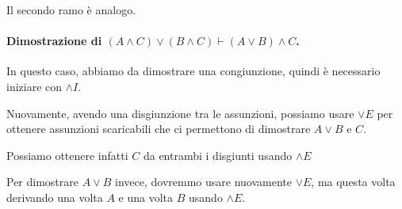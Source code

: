 Il secondo ramo è analogo.

\begin{prooftree}
\end{prooftree}

\paragraph{Dimostrazione di \((A \land C) \lor (B \land C) \vdash (A \lor B) \land C\).}

In questo caso, abbiamo da dimostrare una congiunzione, quindi è necessario iniziare con \(\land I\).

\begin{prooftree}
\end{prooftree}

Nuovamente, avendo una disgiunzione tra le assunzioni, possiamo usare \(\lor E\) per ottenere assunzioni scaricabili che ci permettono di dimostrare \(A \lor B\) e \(C\).

Possiamo ottenere infatti \(C\) da entrambi i disgiunti usando \(\land E\)

\begin{prooftree}
\end{prooftree}

Per dimostrare \(A \lor B\) invece, dovremmo usare nuovamente \(\lor E\), ma questa volta derivando una volta \(A\) e una volta \(B\) usando \(\land E\).

